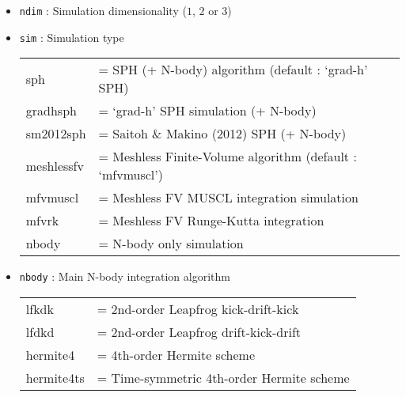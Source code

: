 \documentclass[a4paper]{article}
\newcommand{\var}[1]{\texttt{#1}}
\begin{document}
\begin{itemize}

\item \var{ndim} : Simulation dimensionality ($1$, $2$ or $3$)

\item \var{sim} : Simulation type \vspace{0.1cm} \\
\begin{tabular}{ll}
sph               & = SPH (+ N-body) algorithm (default : `grad-h' SPH) \\
gradhsph          & = `grad-h' SPH simulation (+ N-body) \\
sm2012sph         & = Saitoh \& Makino (2012) SPH (+ N-body) \\
meshlessfv        & = Meshless Finite-Volume algorithm (default : `mfvmuscl') \\
mfvmuscl          & = Meshless FV MUSCL integration simulation \\
mfvrk             & = Meshless FV Runge-Kutta integration \\
nbody             & = N-body only simulation
\end{tabular}

\item \var{nbody} : Main N-body integration algorithm \\
\begin{tabular}{ll}
lfkdk        & = 2nd-order Leapfrog kick-drift-kick \\
lfdkd        & = 2nd-order Leapfrog drift-kick-drift \\
hermite4     & = 4th-order Hermite scheme \\
hermite4ts   & = Time-symmetric 4th-order Hermite scheme
\end{tabular}


\end{itemize}
\end{document}
